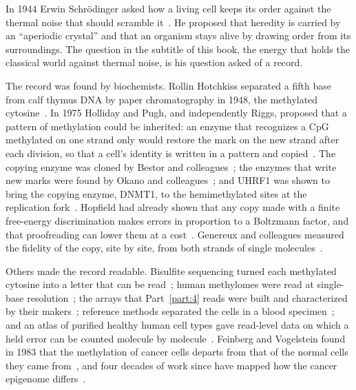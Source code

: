 In 1944 Erwin Schr\"odinger asked how a living cell keeps its order against the thermal noise that should scramble it~\cite{SchrodingerWhatIsLife}.
He proposed that heredity is carried by an ``aperiodic crystal'' and that an organism stays alive by drawing order from its surroundings.
\conjecture{} The question in the subtitle of this book, the energy that holds the classical world against thermal noise, is his question asked
of a record. \interp

The record was found by biochemists. Rollin Hotchkiss separated a fifth base from calf thymus DNA by paper chromatography in 1948, the
methylated cytosine~\cite{Hotchkiss1948}. \observed{} In 1975 Holliday and Pugh, and independently Riggs, proposed that a pattern of
methylation could be inherited: an enzyme that recognizes a CpG methylated on one strand only would restore the mark on the new strand after
each division, so that a cell's identity is written in a pattern and copied~\cite{HollidayPugh1975,Riggs1975}. The copying enzyme was cloned
by Bestor and colleagues~\cite{Bestor1988}; the enzymes that write new marks were found by Okano and colleagues~\cite{Okano1999}; and UHRF1
was shown to bring the copying enzyme, DNMT1, to the hemimethylated sites at the replication fork~\cite{Bostick2007,Sharif2007}. \observed{}
Hopfield had already shown that any copy made with a finite free-energy discrimination makes errors in proportion to a Boltzmann factor, and
that proofreading can lower them at a cost~\cite{Hopfield1974}. \derived{} Genereux and colleagues measured the fidelity of the copy, site by
site, from both strands of single molecules~\cite{Genereux2005}. \observed

Others made the record readable. Bisulfite sequencing turned each methylated cytosine into a letter that can be read~\cite{Frommer1992};
human methylomes were read at single-base resolution~\cite{Lister2009}; the arrays that Part~\ref{part:4} reads were built and characterized
by their makers~\cite{Bibikova2011,Pidsley2016}; reference methods separated the cells in a blood specimen~\cite{Houseman2012,Salas2018}; and
an atlas of purified healthy human cell types gave read-level data on which a held error can be counted molecule by
molecule~\cite{Loyfer2023}. \observed{} Feinberg and Vogelstein found in 1983 that the methylation of cancer cells departs from that of the
normal cells they came from~\cite{FeinbergVogelstein1983}, and four decades of work since have mapped how the cancer epigenome
differs~\cite{Baylin2011}. \observed

